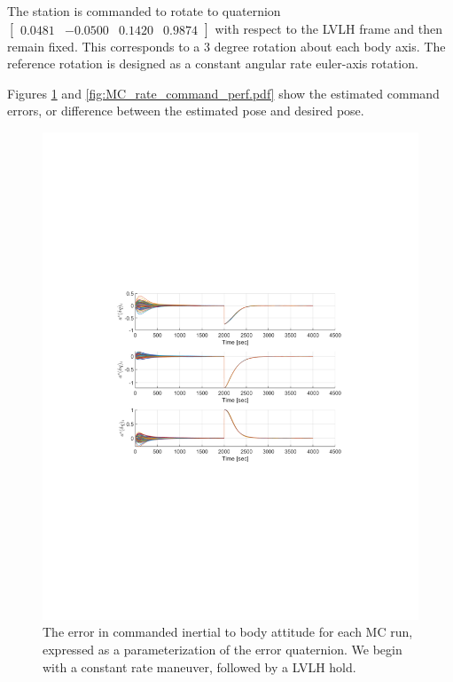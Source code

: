 \documentclass[]{article}
\begin{document}
The station is commanded to rotate to quaternion $\begin{bmatrix} 0.0481 & -0.0500 & 0.1420 & 0.9874 \end{bmatrix} $  with respect to the LVLH frame and then remain fixed. This corresponds to a 3 degree rotation about each body axis. The reference rotation is designed as a constant angular rate euler-axis rotation.

Figures \ref{fig:MC_quat_command_perf.pdf} and \ref{fig:MC_rate_command_perf.pdf} show the estimated command errors, or difference between the estimated pose and desired pose.

\begin{figure}[!h]
	\centering
	\includegraphics[width=\linewidth,trim={4cm, 8cm, 4cm, 8cm},clip]{figs/MC_quat_command_perf.pdf}
	\caption{The error in commanded inertial to body attitude for each MC run, expressed as a parameterization of the error quaternion. We begin with a constant rate maneuver, followed by a LVLH hold.}
	\label{fig:MC_quat_command_perf.pdf}
\end{figure}
\end{document}
